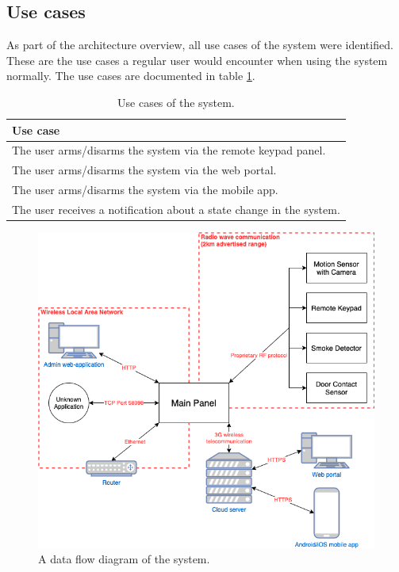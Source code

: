 \subsection{Use cases}
As part of the architecture overview, all use cases of the system were identified. These are the use cases a regular user would encounter when using the system normally. The use cases are documented in table \ref{tb:use-cases}.
\begin{table}[!ht]
    \centering
    \begin{tabular}{l}
        \hline
        \textbf{Use case}
        \\ \hline
        The user arms/disarms the system via the remote keypad panel.
        \\
        The user arms/disarms the system via the web portal.
        \\
        The user arms/disarms the system via the mobile app.
        \\
        The user receives a notification about a state change in the system.
        \\ \hline
    \end{tabular}
    \caption{Use cases of the system.}
    \label{tb:use-cases}
\end{table}

\begin{figure}[!p]
    \centering
    \includegraphics[width=\textwidth]{images/5-threat-model/system-overview.png}
    \caption{A data flow diagram of the system.}
    \label{fig:system-overview}
\end{figure}

